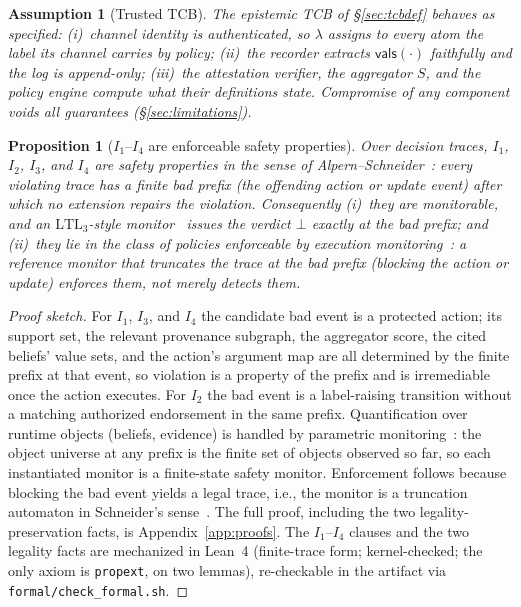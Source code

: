 \documentclass[conference,compsoc]{IEEEtran}
\newtheorem{proposition}{Proposition}
\newtheorem{assumption}{Assumption}
\theoremstyle{definition}
\theoremstyle{plain}
\newcommand{\Ione}{\ensuremath{I_1}}
\newcommand{\Itwo}{\ensuremath{I_2}}
\newcommand{\Ithree}{\ensuremath{I_3}}
\newcommand{\Ifour}{\ensuremath{I_4}}
\newcommand{\vals}{\ensuremath{\mathsf{vals}}}
\begin{document}
\begin{assumption}[Trusted TCB]
\label{asm:recorded}
The epistemic TCB of \S\ref{sec:tcbdef} behaves as specified:
(i)~channel identity is authenticated, so $\lambda$ assigns to every
atom the label its channel carries by policy; (ii)~the recorder
extracts $\vals(\cdot)$ faithfully and the log is append-only;
(iii)~the attestation verifier, the aggregator $S$, and the policy
engine compute what their definitions state. Compromise of any
component voids all guarantees (\S\ref{sec:limitations}).
\end{assumption}

\begin{proposition}[\Ione--\Ifour{} are enforceable safety properties]
\label{prop:safety}
Over decision traces, \Ione, \Itwo, \Ithree, and \Ifour{} are safety
properties in the sense of Alpern--Schneider~\cite{alpern}: every
violating trace has a finite bad prefix (the offending action or
update event) after which no extension repairs the violation.
Consequently (i)~they are monitorable, and an
$\mathrm{LTL}_3$-style monitor~\cite{bauer,pnueli} issues the
verdict $\bot$ exactly at the bad prefix; and (ii)~they lie in
the class of policies enforceable by execution
monitoring~\cite{schneider}: a reference monitor that truncates
the trace at the bad prefix (blocking the action or
update) enforces them, not merely detects them.
\end{proposition}

\begin{proof}[Proof sketch]
For \Ione, \Ithree, and \Ifour{} the candidate bad event is a protected
action; its support set, the relevant provenance subgraph, the
aggregator score, the cited beliefs' value sets, and the action's
argument map are all determined by the finite prefix at that event, so
violation is a property of the prefix and is irremediable once the
action executes. For \Itwo{} the bad event is a label-raising
transition without a matching authorized endorsement in the same
prefix. Quantification over runtime objects (beliefs, evidence) is
handled by parametric monitoring~\cite{mop}: the object universe at
any prefix is the finite set of objects observed so far, so each
instantiated monitor is a finite-state safety monitor. Enforcement
follows because blocking the bad event yields a legal trace, i.e., the
monitor is a truncation automaton in Schneider's
sense~\cite{schneider}. The full proof, including the two
legality-preservation facts, is Appendix~\ref{app:proofs}. The
\Ione--\Ifour{} clauses and the two legality facts are mechanized in
Lean~4 (finite-trace form; kernel-checked; the only axiom is
\texttt{propext}, on two lemmas), re-checkable in the artifact via
\texttt{formal/check\_formal.sh}.
\end{proof}
\end{document}
